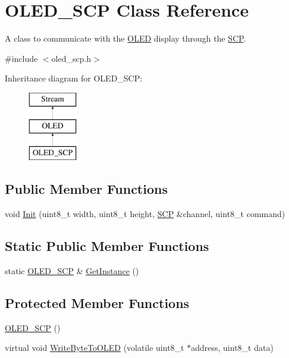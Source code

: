 \hypertarget{class_o_l_e_d___s_c_p}{}\section{O\+L\+E\+D\+\_\+\+S\+CP Class Reference}
\label{class_o_l_e_d___s_c_p}


A class to communicate with the \hyperlink{class_o_l_e_d}{O\+L\+ED} display through the \hyperlink{class_s_c_p}{S\+CP}.  




{\ttfamily \#include $<$oled\+\_\+scp.\+h$>$}

Inheritance diagram for O\+L\+E\+D\+\_\+\+S\+CP\+:\begin{figure}[H]
\begin{center}
\leavevmode
\includegraphics[height=3.000000cm]{class_o_l_e_d___s_c_p}
\end{center}
\end{figure}
\subsection*{Public Member Functions}
\begin{DoxyCompactItemize}
\item 
void \hyperlink{class_o_l_e_d___s_c_p_a7747b903ab94fe91bad520a3f0919e7a}{Init} (uint8\+\_\+t width, uint8\+\_\+t height, \hyperlink{class_s_c_p}{S\+CP} \&channel, uint8\+\_\+t command)
\end{DoxyCompactItemize}
\subsection*{Static Public Member Functions}
\begin{DoxyCompactItemize}
\item 
static \hyperlink{class_o_l_e_d___s_c_p}{O\+L\+E\+D\+\_\+\+S\+CP} \& \hyperlink{class_o_l_e_d___s_c_p_a25644abcadcbb50816128fb31b7af83b}{Get\+Instance} ()
\end{DoxyCompactItemize}
\subsection*{Protected Member Functions}
\begin{DoxyCompactItemize}
\item 
\hyperlink{class_o_l_e_d___s_c_p_a8a52dd583b6f4bdf479204c31c99b4b7}{O\+L\+E\+D\+\_\+\+S\+CP} ()
\item 
virtual void \hyperlink{class_o_l_e_d___s_c_p_a5488fa5865fd8c0e83eb3c8ff7a216cf}{Write\+Byte\+To\+O\+L\+ED} (volatile uint8\+\_\+t $\ast$address, uint8\+\_\+t data)
\end{DoxyCompactItemize}
